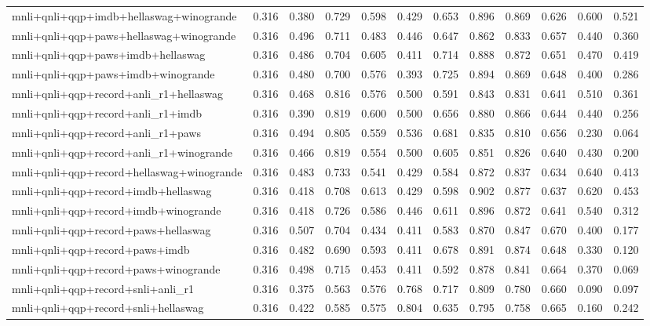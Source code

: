 \begin{table}[t]
\begin{tabular}{lrrrrrrrrrrr}
    mnli+qnli+qqp+imdb+hellaswag+winogrande & 0.316 & 0.380 & 0.729 & 0.598 & 0.429 & 0.653 & 0.896 & 0.869 & 0.626 & 0.600 & 0.521 \\
    mnli+qnli+qqp+paws+hellaswag+winogrande & 0.316 & 0.496 & 0.711 & 0.483 & 0.446 & 0.647 & 0.862 & 0.833 & 0.657 & 0.440 & 0.360 \\
    mnli+qnli+qqp+paws+imdb+hellaswag & 0.316 & 0.486 & 0.704 & 0.605 & 0.411 & 0.714 & 0.888 & 0.872 & 0.651 & 0.470 & 0.419 \\
    mnli+qnli+qqp+paws+imdb+winogrande & 0.316 & 0.480 & 0.700 & 0.576 & 0.393 & 0.725 & 0.894 & 0.869 & 0.648 & 0.400 & 0.286 \\
    mnli+qnli+qqp+record+anli\_r1+hellaswag & 0.316 & 0.468 & 0.816 & 0.576 & 0.500 & 0.591 & 0.843 & 0.831 & 0.641 & 0.510 & 0.361 \\
    mnli+qnli+qqp+record+anli\_r1+imdb & 0.316 & 0.390 & 0.819 & 0.600 & 0.500 & 0.656 & 0.880 & 0.866 & 0.644 & 0.440 & 0.256 \\
    mnli+qnli+qqp+record+anli\_r1+paws & 0.316 & 0.494 & 0.805 & 0.559 & 0.536 & 0.681 & 0.835 & 0.810 & 0.656 & 0.230 & 0.064 \\
    mnli+qnli+qqp+record+anli\_r1+winogrande & 0.316 & 0.466 & 0.819 & 0.554 & 0.500 & 0.605 & 0.851 & 0.826 & 0.640 & 0.430 & 0.200 \\
    mnli+qnli+qqp+record+hellaswag+winogrande & 0.316 & 0.483 & 0.733 & 0.541 & 0.429 & 0.584 & 0.872 & 0.837 & 0.634 & 0.640 & 0.413 \\
    mnli+qnli+qqp+record+imdb+hellaswag & 0.316 & 0.418 & 0.708 & 0.613 & 0.429 & 0.598 & 0.902 & 0.877 & 0.637 & 0.620 & 0.453 \\
    mnli+qnli+qqp+record+imdb+winogrande & 0.316 & 0.418 & 0.726 & 0.586 & 0.446 & 0.611 & 0.896 & 0.872 & 0.641 & 0.540 & 0.312 \\
    mnli+qnli+qqp+record+paws+hellaswag & 0.316 & 0.507 & 0.704 & 0.434 & 0.411 & 0.583 & 0.870 & 0.847 & 0.670 & 0.400 & 0.177 \\
    mnli+qnli+qqp+record+paws+imdb & 0.316 & 0.482 & 0.690 & 0.593 & 0.411 & 0.678 & 0.891 & 0.874 & 0.648 & 0.330 & 0.120 \\
    mnli+qnli+qqp+record+paws+winogrande & 0.316 & 0.498 & 0.715 & 0.453 & 0.411 & 0.592 & 0.878 & 0.841 & 0.664 & 0.370 & 0.069 \\
    mnli+qnli+qqp+record+snli+anli\_r1 & 0.316 & 0.375 & 0.563 & 0.576 & 0.768 & 0.717 & 0.809 & 0.780 & 0.660 & 0.090 & 0.097 \\
    mnli+qnli+qqp+record+snli+hellaswag & 0.316 & 0.422 & 0.585 & 0.575 & 0.804 & 0.635 & 0.795 & 0.758 & 0.665 & 0.160 & 0.242 \\

\end{tabular}
\end{table}
